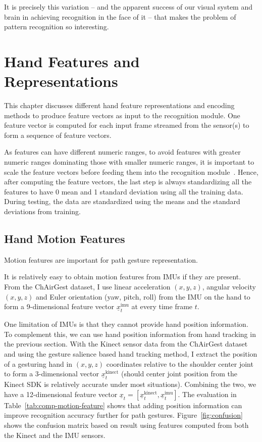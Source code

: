 \begin{savequote}
It is precisely this variation -- and the apparent success of our visual system
and brain in achieving recognition in the face of it -- that makes the problem
of pattern recognition so interesting.
\end{savequote}
\chapter{Hand Features and Representations}\label{chap:feature}
This chapter discusses different 
hand feature representations and encoding methods to produce feature
vectors as input to the recognition module.  One feature vector is computed
for each input frame streamed from the sensor(s) to form a sequence of feature
vectors.

As features can have different numeric ranges, to avoid features with greater
numeric ranges dominating those with smaller numeric ranges, it is important to
scale the feature vectors before feeding them  into the recognition
module~\cite{hsu10}. Hence, after computing the feature vectors, the last step
is always standardizing all the features to have 0 mean and 1 standard deviation
using all the training data. During testing, the data are standardized using the means and the standard deviations from training.

\section{Hand Motion Features}
Motion features are important for path gesture representation. 

It is relatively easy to obtain motion features from IMUs if they are present.
From the ChAirGest dataset, I use linear acceleration $(x, y, z)$,
angular velocity $(x, y, z)$ and Euler orientation (yaw, pitch, roll) from the
IMU on the hand to form a 9-dimensional feature vector
$\underline{x}_t^{\text{imu}}$ at every time frame $t$.

One limitation of IMUs is that they cannot provide hand position information. To
complement this, we can use hand position information from hand tracking in the
previous section. With the Kinect sensor data from the ChAirGest dataset and
using the gesture salience based hand tracking method, I extract the position of a gesturing hand in $(x, y, z)$ coordinates relative to the shoulder center joint to form a 3-dimensional vector $\underline{x}^\text{kinect}_t$ (should center joint position from the Kinect
SDK is relatively accurate under most situations).
Combining the two, we
have a 12-dimensional feature vector $\underline{x}_t =
[\underline{x}^\text{kinect}_t, \underline{x}^\text{imu}_t]$.
The evaluation in Table~\ref{tab:comp-motion-feature} shows that adding
position information can improve recognition accuracy further for path gestures.
Figure~\ref{fig:confusion} shows the confusion matrix based on result using
features computed from both the Kinect and the IMU sensors.

